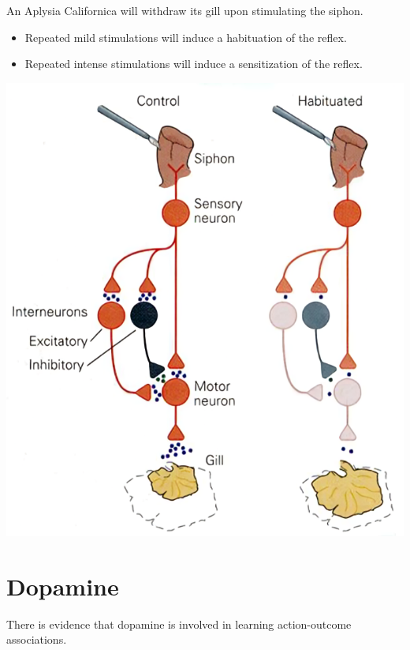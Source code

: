 \begin{minipage}{0.55\linewidth}
    \begin{casestudy}
        An Aplysia Californica will withdraw its gill upon stimulating the siphon.
        \begin{itemize}
            \item Repeated mild stimulations will induce a habituation of the reflex.
            \item Repeated intense stimulations will induce a sensitization of the reflex.
        \end{itemize}
    \end{casestudy}
\end{minipage}
\begin{minipage}{0.4\linewidth}
    \centering
    \includegraphics[width=0.9\linewidth]{./img/gill_habituation.png}
\end{minipage}



\section{Dopamine}

There is evidence that dopamine is involved in learning action-outcome associations.

